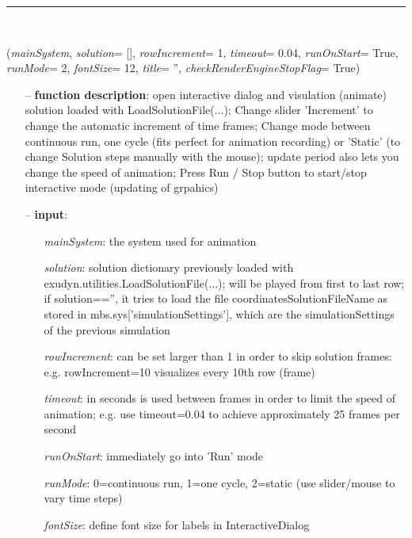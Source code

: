 \begin{itemize}[leftmargin=1.4cm]
\begin{itemize}[leftmargin=1.4cm]
\begin{itemize}[leftmargin=0.5cm]
\begin{itemize}[leftmargin=1.4cm]
\begin{itemize}[leftmargin=1.4cm]
\begin{itemize}[leftmargin=0.5cm]
\begin{itemize}[leftmargin=1.4cm]
\begin{itemize}[leftmargin=0.5cm]
\begin{itemize}[leftmargin=1.4cm]
\begin{itemize}[leftmargin=1.4cm]
%
\noindent\rule{8cm}{0.75pt}\vspace{1pt} \\ 
\begin{flushleft}
\label{sec:interactive:SolutionViewer}
({\it mainSystem}, {\it solution}= [], {\it rowIncrement}= 1, {\it timeout}= 0.04, {\it runOnStart}= True, {\it runMode}= 2, {\it fontSize}= 12, {\it title}= '', {\it checkRenderEngineStopFlag}= True)
\end{flushleft}
\setlength{\itemindent}{0.7cm}
\begin{itemize}[leftmargin=0.7cm]
\item[--]{\bf function description}: open interactive dialog and visulation (animate) solution loaded with LoadSolutionFile(...); Change slider 'Increment' to change the automatic increment of time frames; Change mode between continuous run, one cycle (fits perfect for animation recording) or 'Static' (to change Solution steps manually with the mouse); update period also lets you change the speed of animation; Press Run / Stop button to start/stop interactive mode (updating of grpahics)
\item[--]{\bf input}: \vspace{-6pt}
\begin{itemize}[leftmargin=1.2cm]
\setlength{\itemindent}{-0.7cm}
\item[]{\it mainSystem}: the system used for animation
\item[]{\it solution}: solution dictionary previously loaded with exudyn.utilities.LoadSolutionFile(...); will be played from first to last row; if solution=='', it tries to load the file coordinatesSolutionFileName as stored in mbs.sys['simulationSettings'], which are the simulationSettings of the previous simulation
\item[]{\it rowIncrement}: can be set larger than 1 in order to skip solution frames: e.g. rowIncrement=10 visualizes every 10th row (frame)
\item[]{\it timeout}: in seconds is used between frames in order to limit the speed of animation; e.g. use timeout=0.04 to achieve approximately 25 frames per second
\item[]{\it runOnStart}: immediately go into 'Run' mode
\item[]{\it runMode}: 0=continuous run, 1=one cycle, 2=static (use slider/mouse to vary time steps)
\item[]{\it fontSize}: define font size for labels in InteractiveDialog

\end{itemize}
\end{itemize}
\end{itemize}
\end{itemize}
\end{itemize}
\end{itemize}
\end{itemize}
\end{itemize}
\end{itemize}
\end{itemize}
\end{itemize}
\end{itemize}
